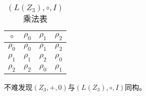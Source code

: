 \documentclass[12pt,onecolumn]{article}
\theoremstyle{plain}
\begin{document}
\begin{table*}[h]
  \centering
  \begin{tabular}{|c|c|c|c|}
    \toprule
    $\circ$ & $\rho_0$ & $\rho_1$ & $\rho_2$ \\
    \midrule
    $\rho_0$ & $\rho_0$ & $\rho_1$ & $\rho_2$ \\
    \midrule
    $\rho_1$ & $\rho_1$ & $\rho_2$ & $\rho_0$ \\
    \midrule
    $\rho_2$ & $\rho_2$ & $\rho_0$ & $\rho_1$ \\
    \bottomrule
  \end{tabular}
    \caption{$(L(Z_3),\circ,I)$乘法表}
\end{table*}

不难发现$(Z_3,+,0)$与$(L(Z_3),\circ,I)$同构。
\end{document}
